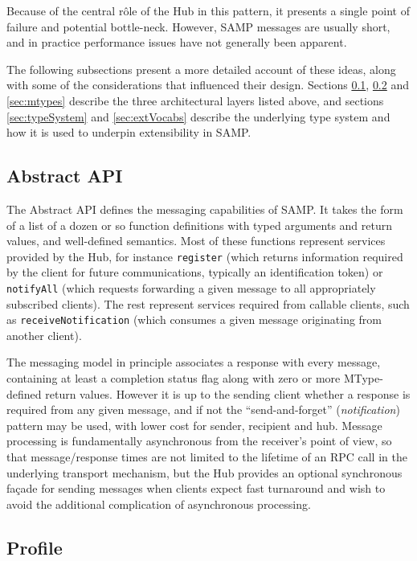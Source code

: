 \documentclass[5p]{elsarticle}
\begin{document}
Because of the central r\^{o}le of the Hub in this pattern,
it presents a single point of failure and potential bottle-neck.
However, SAMP messages are usually short,
and in practice performance issues have not generally been apparent.

The following subsections present a more detailed account of
these ideas, along with some of the considerations that influenced
their design.
Sections \ref{sec:abstractApi}, \ref{sec:profile} and \ref{sec:mtypes}
describe the three architectural layers listed above,
and sections \ref{sec:typeSystem} and \ref{sec:extVocabs}
describe the underlying type system and how it is used to underpin
extensibility in SAMP.

\subsection{Abstract API} \label{sec:abstractApi}

The Abstract API defines the messaging capabilities of SAMP.
It takes the form of a list of a dozen or so function definitions
with typed arguments and return values, and well-defined semantics.
Most of these functions represent services provided by the Hub,
for instance
{\tt register} (which returns information required by the
client for future communications, typically an identification token)
or {\tt notifyAll} (which requests forwarding a given message to
all appropriately subscribed clients).
The rest represent services required from callable clients, such as
{\tt receiveNotification} (which consumes a given message originating
from another client).

The messaging model in principle associates
a response with every message, containing at least a completion
status flag along with zero or more MType-defined return values.
However it is up to the sending client whether a response is
required from any given message, and if not the ``send-and-forget''
({\em notification\/}) pattern may be used,
with lower cost for sender, recipient and hub.
Message processing is fundamentally asynchronous from the
receiver's point of view, so that message/response times are
not limited to the lifetime of an RPC call in the underlying
transport mechanism, but the Hub provides an optional synchronous
fa\c{c}ade for sending messages when clients expect fast turnaround
and wish to avoid the additional complication of asynchronous processing.


\subsection{Profile} \label{sec:profile}
\end{document}
